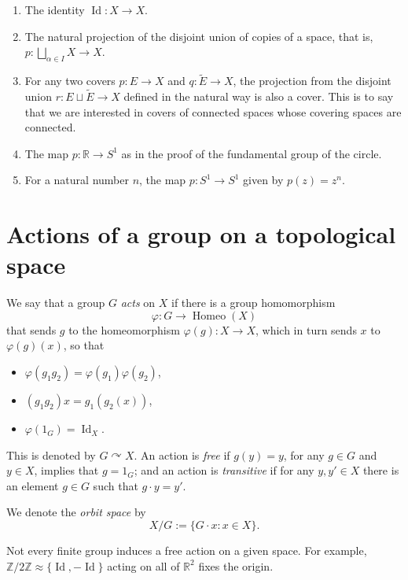 \begin{example}
\label{example-covering-spaces}
\begin{enumerate}
\item The identity
$\operatorname{Id}:X\to X$.
\item The natural projection of the
disjoint union of copies of a space,
that is,
$p:\bigsqcup_{\alpha\in I}X\to X$.
\item For any two covers $p:E\to X$ and
$q:\tilde{E}\to X$, the projection from
the disjoint union
$r:E\sqcup\tilde{E}\to X$ defined in the
natural way is also a cover. This is to
say that we are interested in covers of
connected spaces whose covering spaces
are connected.
\item The map $p:\mathbb{R}\to S^1$ as
in the proof of the fundamental group of
the circle.
\item For a natural number $n$, the map
$p:S^1\to S^1$ given by $p(z)=z^n$.
\end{enumerate}
\end{example}

\section{Actions of a group on a
topological space}
\label{section-group-actions}

\begin{definition}
\label{definition-action}
We say that a group $G$ {\it acts} on
$X$ if there is a group homomorphism
$$
\varphi:G\to\operatorname{Homeo}(X)
$$
that sends $g$ to the homeomorphism
$\varphi(g):X\to X$, which in turn sends
$x$ to $\varphi(g)(x)$, so that
\begin{itemize}
\item $\varphi(g_1g_2)
=\varphi(g_1)\varphi(g_2)$,
\item $(g_1g_2)x=g_1(g_2(x))$,
\item $\varphi(1_G)
=\operatorname{Id}_X$.
\end{itemize}
This is denoted by
$G\curvearrowright X$. An action is
{\it free} if $g(y)=y$, for any $g\in G$
and $y\in X$, implies that $g=1_G$; and
an action is {\it transitive} if for any
$y,y'\in X$ there is an element $g\in G$
such that $g\cdot y=y'$.

We denote the {\it orbit space} by
$$
X/G:=\{G\cdot x:x\in X\}.
$$
\end{definition}

\begin{remark}
\label{remark-not-free}
Not every finite group induces a free
action on a given space. For example,
$\mathbb{Z}/2\mathbb{Z}\approx
\{\operatorname{Id},
-\operatorname{Id}\}$
acting on all of $\mathbb{R}^2$ fixes
the origin.
\end{remark}

